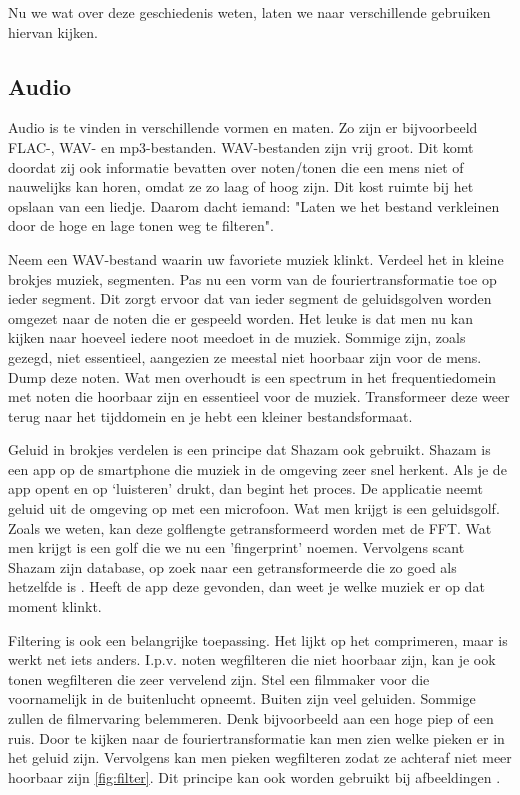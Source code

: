 \documentclass[11pt,fleqn]{book} %
\begin{document}
Nu we wat over deze geschiedenis weten, laten we naar verschillende gebruiken hiervan kijken.

\subsection{Audio}
Audio is te vinden in verschillende vormen en maten. Zo zijn er bijvoorbeeld FLAC-, WAV- en mp3-bestanden. WAV-bestanden zijn vrij groot. Dit komt doordat zij ook informatie bevatten over noten/tonen die een mens niet of nauwelijks kan horen, omdat ze zo laag of hoog zijn. Dit kost ruimte bij het opslaan van een liedje. Daarom dacht iemand: "Laten we het bestand verkleinen door de hoge en lage tonen weg te filteren".

Neem een WAV-bestand waarin uw favoriete muziek klinkt. Verdeel het in kleine brokjes muziek, segmenten. Pas nu een vorm van de fouriertransformatie toe op ieder segment. Dit zorgt ervoor dat van ieder segment de geluidsgolven worden omgezet naar de noten die er gespeeld worden. Het leuke is dat men nu kan kijken naar hoeveel iedere noot meedoet in de muziek. Sommige zijn, zoals gezegd, niet essentieel, aangezien ze meestal niet hoorbaar zijn voor de mens. Dump deze noten. Wat men overhoudt is een spectrum in het frequentiedomein met noten die hoorbaar zijn en essentieel voor de muziek. Transformeer deze weer terug naar het tijddomein en je hebt een kleiner bestandsformaat.

Geluid in brokjes verdelen is een principe dat Shazam ook gebruikt. Shazam is een app op de smartphone die muziek in de omgeving zeer snel herkent. Als je de app opent en op ‘luisteren’ drukt, dan begint het proces. De applicatie neemt geluid uit de omgeving op met een microfoon. Wat men krijgt is een geluidsgolf. Zoals we weten, kan deze golflengte getransformeerd worden met de FFT. Wat men krijgt is een golf die we nu een 'fingerprint' noemen. Vervolgens scant Shazam zijn database, op zoek naar een getransformeerde die zo goed als hetzelfde is \cite{shazam}. Heeft de app deze gevonden, dan weet je welke muziek er op dat moment klinkt. 

Filtering is ook een belangrijke toepassing. Het lijkt op het comprimeren, maar is werkt net iets anders. I.p.v. noten wegfilteren die niet hoorbaar zijn, kan je ook tonen wegfilteren die zeer vervelend zijn. Stel een filmmaker voor die voornamelijk in de buitenlucht opneemt. Buiten zijn veel geluiden. Sommige zullen de filmervaring belemmeren. Denk bijvoorbeeld aan een hoge piep of een ruis. Door te kijken naar de fouriertransformatie kan men zien welke pieken er in het geluid zijn. Vervolgens kan men pieken wegfilteren zodat ze achteraf niet meer hoorbaar zijn \ref{fig:filter}. Dit principe kan ook worden gebruikt bij afbeeldingen \cite{fc}.
\end{document}
